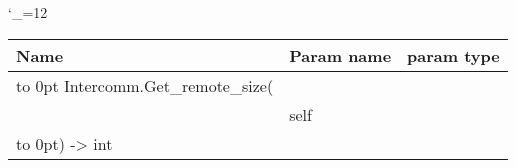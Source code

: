 \begingroup \catcode`\_=12 \tt
\begin{tabular}{lll}
\toprule
\textrm{Name}&\textrm{Param name}&\textrm{param type}\\
\midrule
\hbox to 0pt {Intercomm.Get_remote_size(\hss}\\
& self\\
\hbox to 0pt{) -> int\hss}\\
\bottomrule
\end{tabular}
\endgroup
